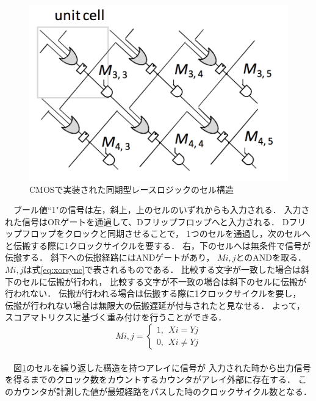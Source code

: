 \begin{itemize}
\begin{figure}[t!]
\begin{center}
\includegraphics[keepaspectratio,scale=0.6]{fig/2/CMOSsync1.png}
\caption{CMOSで実装された同期型レースロジックのセル構造\cite{madhavan2014race}}
\label{fig:CMOSsync}
\end{center}
\end{figure}
\ \ ブール値``1"の信号は左，斜上，上のセルのいずれからも入力される．
入力された信号はORゲートを通過して、Dフリップフロップへと入力される．
Dフリップフロップをクロックと同期させることで，
1つのセルを通過し，次のセルへと伝搬する際に1クロックサイクルを要する．
右，下のセルへは無条件で信号が伝搬する．
斜下への伝搬経路にはANDゲートがあり，
$M{i,j}$とのANDを取る．
$M{i,j}$は式\ref{eq:xorsync}で表されるものである．
比較する文字が一致した場合は斜下のセルに伝搬が行われ，
比較する文字が不一致の場合は斜下のセルに伝搬が行われない．
伝搬が行われる場合は伝搬する際に1クロックサイクルを要し，
伝搬が行われない場合は無限大の伝搬遅延が付与されたと見なせる．
よって，スコアマトリクスに基づく重み付けを行うことができる．
\begin{equation}
M{i,j}= \left \{
\begin{array}{l}
1, \ \ X{i}=Y{j}\\
0, \ \ X{i} \neq Y{j}
\end{array}
\right.
\label{eq:xorsync}
\end{equation}
\\
\ \ 図\ref{fig:CMOSsync}のセルを繰り返した構造を持つアレイに信号が
入力された時から出力信号を得るまでのクロック数をカウントするカウンタがアレイ外部に存在する．
このカウンタが計測した値が最短経路をパスした時のクロックサイクル数となる．


\end{itemize}
